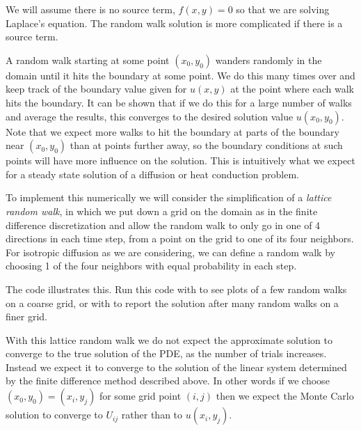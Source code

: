 \documentclass[letterpaper,10pt,english]{sphinxmanual}
\begin{document}
We will assume there is no source term, \(f(x,y)=0\) so that we are
solving Laplace's equation.  The random walk solution is more complicated if
there is a source term.

A random walk starting at some point \((x_0,y_0)\) wanders randomly in
the domain until it hits the boundary at some point.  We do this many times
over and keep track of the boundary value given for \(u(x,y)\) at the
point where each walk hits the boundary.  It can be shown that if we
do this for
a large number of walks and average the results, this converges to the
desired solution value \(u(x_0,y_0)\).  Note that we expect more walks
to hit the boundary at parts of the boundary near \((x_0,y_0)\) than
at points further away, so the boundary conditions at such points will have
more influence on the solution.  This is intuitively what we expect for a
steady state solution of a diffusion or heat conduction problem.

To implement this numerically we will consider the simplification
of a \emph{lattice random walk}, in which we put down a grid on the domain as in
the finite difference discretization and allow the random walk to only go in
one of 4 directions in each time step, from a point on the grid to one of
its four neighbors.  For isotropic diffusion as we are considering,
we can define a random walk by choosing 1 of the four
neighbors with equal probability in each step.

The code  illustrates this.
Run this code with
 to see plots of a few random walks on a coarse grid, or with
 to report the solution after many random walks on a finer
grid.

With this lattice random walk we do not expect the approximate solution to
converge to the true solution of the PDE, as the number of trials increases.
Instead we expect it to converge to the solution of the linear system
determined by the finite difference method described above.
In other words if we choose \((x_0,y_0) = (x_i, y_j)\) for some grid
point \((i,j)\) then we expect the Monte Carlo solution to converge to
\(U_{ij}\) rather than to \(u(x_i,y_j)\).
\end{document}
